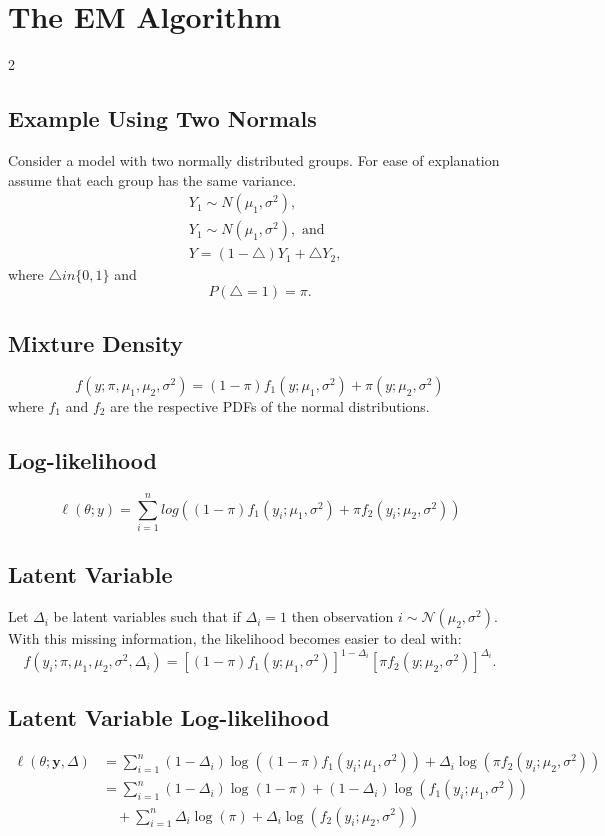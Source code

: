\documentclass[a4paper,9pt,fleqn]{extarticle}
\begin{document}
\section{The EM Algorithm}
\begin{multicols}{2}
\subsection*{Example Using Two Normals}
Consider a model with two normally distributed groups. For ease of explanation assume that each group has the same variance.
\begin{align*}
    &Y_1 \sim N(\mu_1, \sigma^2),\\
    &Y_1 \sim N(\mu_1, \sigma^2),\text{ and}\\
    &Y = (1 - \bigtriangleup)Y_1 + \bigtriangleup Y_2,
\end{align*}
where \(\bigtriangleup in \{0,1\}\) and
\[
P(\bigtriangleup = 1) = \pi.
\]
\subsection*{Mixture Density}
\[
f(y;\pi, \mu_1, \mu_2, \sigma^2) = (1 - \pi)f_1(y;\mu_1, \sigma^2) + \pi(y;\mu_2, \sigma^2)
\]
where \(f_1\) and \(f_2\) are the respective PDFs of the normal distributions.
\subsection*{Log-likelihood}
\[
\ell(\theta;y) = \sum_{i=1}^{n}log((1 - \pi)f_1(y_i;\mu_1, \sigma^2) + \pi f_2(y_i;\mu_2, \sigma^2))
\]
\subsection*{Latent Variable}
Let $\Delta_i$ be latent variables such that if $\Delta_i = 1$ then observation $i \sim \mathcal{N}(\mu_2, \sigma^2)$.\\
With this missing information, the likelihood becomes easier to deal with:
\[
f(y_i; \pi, \mu_1, \mu_2, \sigma^2, \Delta_i)
= \left[(1 - \pi) f_1(y; \mu_1, \sigma^2)\right]^{1 - \Delta_i}
  \left[\pi f_2(y; \mu_2, \sigma^2)\right]^{\Delta_i}.
\]
\subsection*{Latent Variable Log-likelihood}

\[
\begin{aligned}
\ell(\theta; \mathbf{y}, \Delta)
&= \sum_{i=1}^n (1 - \Delta_i) \log\left( (1 - \pi) f_1(y_i; \mu_1, \sigma^2) \right) + \Delta_i \log\left( \pi f_2(y_i; \mu_2, \sigma^2) \right) \\
&= \sum_{i=1}^n (1 - \Delta_i) \log(1 - \pi) + (1 - \Delta_i) \log\left( f_1(y_i; \mu_1, \sigma^2) \right) \\
&\quad + \sum_{i=1}^n \Delta_i \log(\pi) + \Delta_i \log\left( f_2(y_i; \mu_2, \sigma^2) \right)
\end{aligned}
\]


\end{multicols}
\end{document}
